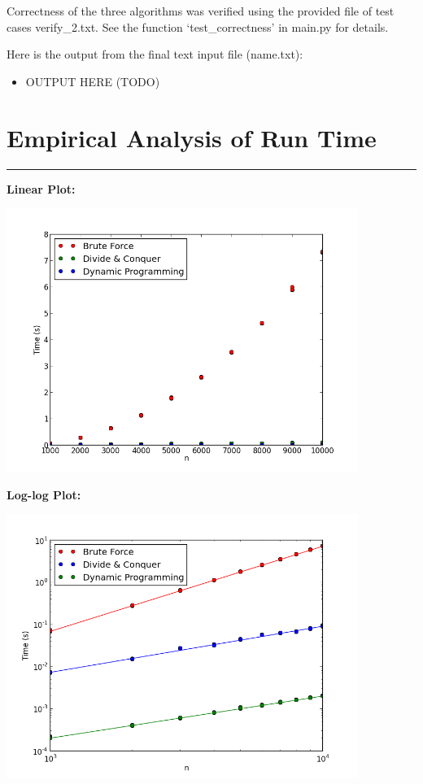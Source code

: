 \documentclass[letterpaper,10pt,titlepage,fleqn]{article}
\begin{document}
Correctness of the three algorithms was verified using the provided file of test cases verify\_2.txt. See the function `test\_correctness' in main.py for details. 

Here is the output from the final text input file (name.txt):

\begin{itemize}
\item OUTPUT HERE (TODO)
\end{itemize}

\newpage

\section*{Empirical Analysis of Run Time}
\hrule
\textbf{Linear Plot:}
\vskip 0.04in
\begin{center}
\includegraphics[width=4.5in]{linear.png}
\end{center}
\textbf{Log-log Plot:}
\vskip 0.04in
\begin{center}
\includegraphics[width=4.5in]{loglog.png}
\end{center}
\end{document}
